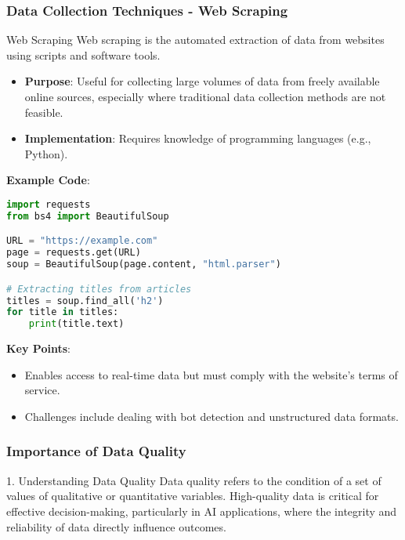 \documentclass[aspectratio=169]{beamer}
\begin{document}
\begin{frame}[fragile]
    \frametitle{Data Collection Techniques - Web Scraping}
    \begin{block}{Web Scraping}
        Web scraping is the automated extraction of data from websites using scripts and software tools.
    \end{block}
    
    \begin{itemize}
        \item \textbf{Purpose}: Useful for collecting large volumes of data from freely available online sources, especially where traditional data collection methods are not feasible.
        \item \textbf{Implementation}: Requires knowledge of programming languages (e.g., Python).
    \end{itemize}
    
    \textbf{Example Code}:
    \begin{lstlisting}[language=Python]
import requests
from bs4 import BeautifulSoup

URL = "https://example.com"
page = requests.get(URL)
soup = BeautifulSoup(page.content, "html.parser")

# Extracting titles from articles
titles = soup.find_all('h2')
for title in titles:
    print(title.text)
    \end{lstlisting}
    
    \textbf{Key Points}:
    \begin{itemize}
        \item Enables access to real-time data but must comply with the website's terms of service.
        \item Challenges include dealing with bot detection and unstructured data formats.
    \end{itemize}
\end{frame}

\begin{frame}[fragile]
    \frametitle{Importance of Data Quality}
    
    \begin{block}{1. Understanding Data Quality}
        Data quality refers to the condition of a set of values of qualitative or quantitative variables.
        High-quality data is critical for effective decision-making, particularly in AI applications, where the integrity and reliability of data directly influence outcomes.
    \end{block}
\end{frame}
\end{document}
